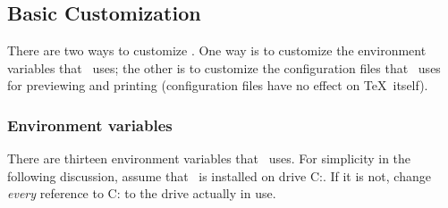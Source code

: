 \subsection{Basic Customization}
\label{sec:emtex:basiccust}

There are 
two ways to customize \emTeX.  One way is to customize the
environment variables that \emTeX\ uses; the other is to customize the
configuration files that \emTeX\ uses for previewing and printing
(configuration files have no effect on \TeX\ itself).

\subsubsection{Environment variables}

There are thirteen environment variables that 
\emTeX\ uses.  For
simplicity in the following discussion, assume that \emTeX\ is installed
on drive C:.  If it is not, change {\em every\/} reference to C:
to the drive actually in use.


